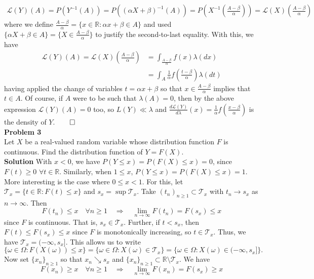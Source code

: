 \documentclass[10pt]{article}
\newcommand{\bp}[1]{\left({#1}\right)}
\newcommand{\mbb}[1]{\mathbb{#1}}
\newcommand{\1}[1]{\mathbbm{1}_{#1}}
\newcommand{\mc}[1]{\mathcal{#1}}
\begin{document}
    \begin{align*}
        \mc{L}(Y)(A)=P(Y^{-1}(A))=P((\alpha X+\beta)^{-1}(A))=P\bp{X^{-1}\bp{\frac{A-\beta}{\alpha}}}=\mc{L}(X)\bp{\frac{A-\beta}{\alpha}}
    \end{align*}
    where we define $\tfrac{A-\beta}{\alpha}=\{x\in\mbb{R}:\alpha x+\beta\in A\}$ and used $\{\alpha X+\beta\in A\}=\{X\in\tfrac{A-\beta}{\alpha}\}$ to justify the second-to-last equality. With this, we have
    \begin{align*}
        \mc{L}(Y)(A)=\mc{L}(X)\bp{\frac{A-\beta}{\alpha}}&=\int_{\frac{A-\beta}{\alpha}}f(x)\lambda(dx)\\
        &=\int_A\frac{1}{\alpha}f\bp{\frac{t-\beta}{\alpha}}\lambda(dt)
    \end{align*}
    having applied the change of variables $t=\alpha x+\beta$ so that $x\in\tfrac{A-\beta}{\alpha}$ implies that $t\in A$. Of course, if $A$ were to be such that $\lambda(A)=0$, then by the above expression $\mc{L}(Y)(A)=0$ too, so $L(Y)\ll\lambda$ and $\tfrac{d\mc{L}(Y)}{d\lambda}(x)=\frac{1}{\alpha}f\bp{\tfrac{x-\beta}{\alpha}}$ is
    the density of $Y$.\hfill{$\qed$}\\[5pt]
    {\bf Problem 3}\\[5pt]
    Let $X$ be a real-valued random variable whose distribution function $F$ is continuous. Find the distribution function of $Y=F(X)$.\\[5pt]
    {\bf Solution}\hspace{5pt} With $x<0$, we have $P(Y\leq x)=P(F(X)\leq x)=0$, since $F(t)\geq 0$ $\forall t\in\mbb{R}$. Similarly, when $1\leq x$, $P(Y\leq x)=P(F(X)\leq x)=1$.
    More interesting is the case where $0\leq x<1$. For this, let $\mc{T}_x=\{t\in\mbb{R}:F(t)\leq x\}$ and $s_x=\sup\mc{T}_x$. Take $(t_n)_{n\geq 1}\subset\mc{T}_x$ with $t_n\rightarrow s_x$ as $n\rightarrow\infty$. Then
    \[F(t_n)\leq x\quad\forall n\geq 1\quad\Rightarrow\quad\lim_{n\rightarrow\infty}F(t_n)=F(s_x)\leq x\tag{1}\]
    since $F$ is continuous. That is, $s_x\in\mc{T}_x$. Further, if $t<s_x$, then $F(t)\leq F(s_x)\leq x$ since $F$ is monotonically increasing, so $t\in\mc{T}_x$. Thus, we have
    $\mc{T}_x=(-\infty,s_x]$. This allows us to write
    \[\{\omega\in\Omega:F(X(\omega))\leq x\}=\{\omega\in\Omega:X(\omega)\in\mc{T}_x\}=\{\omega\in\Omega:X(\omega)\in(-\infty,s_x]\}.\tag{2}\]
    Now set $\{x_n\}_{n\geq 1}$ so that $x_n\searrow s_x$ and $\{x_n\}_{n\geq 1}\subset\mbb{R}\setminus\mc{T}_x$. We have
    \[F(x_n)\geq x\quad\forall n\geq 1\quad\Rightarrow\quad\lim_{n\rightarrow\infty}F(x_n)=F(s_x)\geq x\]
\end{document}
